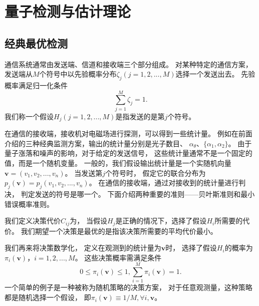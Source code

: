 \section{量子检测与估计理论}
\subsection{经典最优检测}
通信系统通常由发送端、信道和接收端三个部分组成。
对某种特定的通信方案，发送端从$M$个符号中以先验概率分布$\zeta_j(j=1,2,...,M)$选择一个发送出去。
先验概率满足归一化条件
\begin{equation}
\sum_{j=1}^M \zeta_j = 1.
\end{equation}
我们称一个假设$H_j (j=1,2,...,M)$是指发送的是第$j$个符号。



在通信的接收端，接收机对电磁场进行探测，可以得到一些统计量。
例如在前面介绍的三种经典监测方案，输出的统计量分别是光子数目、
$\alpha_\theta$、$\{\alpha_1, \alpha_2\}$。
由于量子涨落和噪声的影响，对于给定的发送信号，
这些统计量通常不是一个固定的值，而是一个随机变量。
一般的，我们假设输出统计量是一个实随机向量$\bm{v} = (v_1, v_2, ..., v_n)$。
当发送第$j$个符号时，
假定它的联合分布为
$p_j(\bm{v}) = p_j(v_1, v_2, ..., v_n)$。
在通信的接收端，通过对接收到的统计量进行判决，
判定发送的符号是哪一个。
下面介绍两种重要的准则——贝叶斯准则和最小错误概率准则。

我们定义决策代价$C_{ij}$为，
当假设$H_j$是正确的情况下，选择了假设$H_i$所需要的代价。
我们期望一个决策是最优的是指该决策所需要的平均代价最小。

我们再来将决策数学化\cite{yzf2002tjxhcl,helstrom1976quantum}，
定义在观测到的统计量为$\bm{v}$时，
选择了假设$H_i$的概率为$\pi_i(\bm{v})$，$i=1,2,...,M$。
这些决策概率需满足条件
\begin{equation}
0 \le \pi_i(\bm{v}) \le 1,  \sum_{i=1}^M \pi_i(\bm{v}) = 1.
\label{eq:pi-cond}
\end{equation}
一个简单的例子是一种被称为随机策略的决策方案，
对于任意观测量，这种策略都是随机选择一个假设，
即$\pi_i(\bm{v}) \equiv 1/M, \forall i, \bm{v}$。

